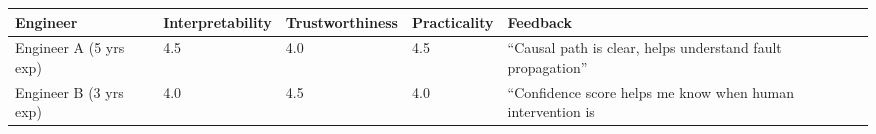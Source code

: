 \begin{longtable}[]{@{}lllll@{}}
\toprule
\begin{minipage}[b]{0.13\columnwidth}\raggedright
Engineer\strut
\end{minipage} & \begin{minipage}[b]{0.21\columnwidth}\raggedright
Interpretability\strut
\end{minipage} & \begin{minipage}[b]{0.21\columnwidth}\raggedright
Trustworthiness\strut
\end{minipage} & \begin{minipage}[b]{0.18\columnwidth}\raggedright
Practicality\strut
\end{minipage} & \begin{minipage}[b]{0.13\columnwidth}\raggedright
Feedback\strut
\end{minipage}\tabularnewline
\midrule
\endhead
\begin{minipage}[t]{0.13\columnwidth}\raggedright
Engineer A (5 yrs exp)\strut
\end{minipage} & \begin{minipage}[t]{0.21\columnwidth}\raggedright
4.5\strut
\end{minipage} & \begin{minipage}[t]{0.21\columnwidth}\raggedright
4.0\strut
\end{minipage} & \begin{minipage}[t]{0.18\columnwidth}\raggedright
4.5\strut
\end{minipage} & \begin{minipage}[t]{0.13\columnwidth}\raggedright
``Causal path is clear, helps understand fault propagation''\strut
\end{minipage}\tabularnewline
\begin{minipage}[t]{0.13\columnwidth}\raggedright
Engineer B (3 yrs exp)\strut
\end{minipage} & \begin{minipage}[t]{0.21\columnwidth}\raggedright
4.0\strut
\end{minipage} & \begin{minipage}[t]{0.21\columnwidth}\raggedright
4.5\strut
\end{minipage} & \begin{minipage}[t]{0.18\columnwidth}\raggedright
4.0\strut
\end{minipage} & \begin{minipage}[t]{0.13\columnwidth}\raggedright
``Confidence score helps me know when human intervention is

\end{minipage}
\end{longtable}
